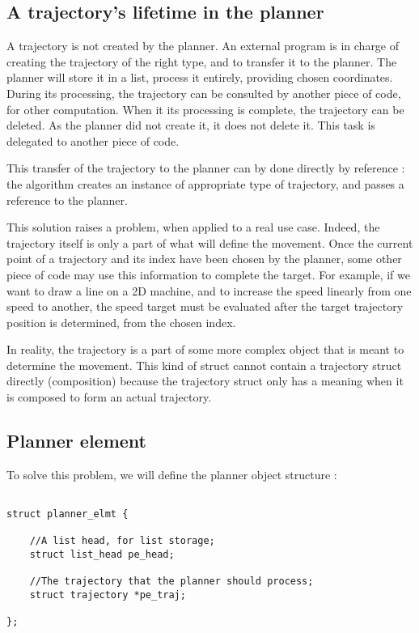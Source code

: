 \subsection{A trajectory's lifetime in the planner}

A trajectory is not created by the planner. An external program is in charge of creating the trajectory of 
the right type, and to transfer it to the planner. 
The planner will store it in a list, process it entirely, providing chosen coordinates.
During its processing, the trajectory can be consulted by another piece of code, for other computation.
When it its processing is complete, the trajectory can be deleted. As the planner did not create it, it 
does not delete it. This task is delegated to another piece of code. 

This transfer of the trajectory to the planner can by done directly by reference : the algorithm creates an 
instance of appropriate type of trajectory, and passes a reference to the planner. 

This solution raises a problem, when applied to a real use case. Indeed, the trajectory itself
is only a part of what will define the movement. Once the current point of a trajectory and its index
have been chosen by the planner, some other piece of code may use this information to complete the target.
For example, if we want to draw a line on a 2D machine, and to increase the speed linearly from one speed to 
another, the speed target must be evaluated after the target trajectory position is determined, from the
chosen index.

In reality, the trajectory is a part of some more complex object that is meant to determine the movement.
This kind of struct cannot contain a trajectory struct directly (composition) because the trajectory struct
only has a meaning when it is composed to form an actual trajectory. 


\subsection{Planner element}

To solve this problem, we will define the planner object structure : 

\begin{lstlisting}[style=CStyle]  

struct planner_elmt {
	
	//A list head, for list storage;
	struct list_head pe_head;
	
	//The trajectory that the planner should process;
	struct trajectory *pe_traj;
	
};

\end{lstlisting}


